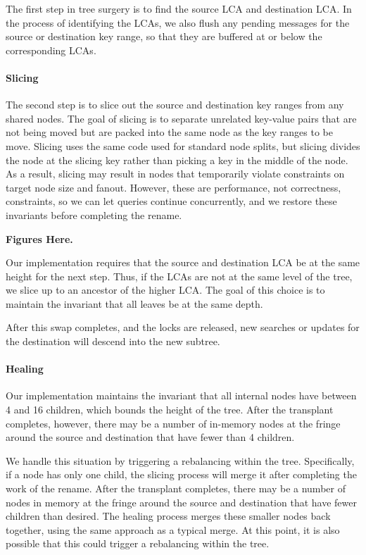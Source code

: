 The first step in tree surgery is to find the source LCA and destination LCA.
In the process of identifying the LCAs, we also flush any pending messages for
the source or destination key range, so that they are buffered at or below the
corresponding LCAs.

\paragraph{Slicing}  The second step is to slice out the source and destination
key ranges from any shared nodes.
The goal of slicing is to separate unrelated key-value pairs that are not being
moved but are packed into the same \bet node as the key ranges to be move.
Slicing uses the same  code used for standard \bet node splits, but slicing
divides the node at the slicing key rather than picking a key in the middle of
the node.
As a result, slicing may result in nodes that temporarily violate constraints on
target node size and fanout.
However, these are performance, not correctness, constraints, so we can let
queries continue concurrently, and we restore these invariants before completing
the rename.

\textbf{Figures Here.}

Our implementation requires that the source and destination LCA be at the same
height for the next step.
Thus, if the LCAs are not at the same level of the tree, we slice up to an
ancestor of the higher LCA.
The goal of this choice is to maintain the invariant that all \bet leaves be
at the same depth.

After this swap completes, and the locks are released,
new searches or updates for the destination will descend into the new subtree.

\paragraph{Healing}  Our \bet implementation maintains the
invariant that all internal nodes have between 4 and 16 children,
which bounds the height of the tree.  After the transplant completes,
however, there may be a number of in-memory \bet nodes at the fringe
around the source and destination that have fewer than 4 children.

We handle this situation by triggering a rebalancing within the tree.
Specifically, if a node has only one child, the slicing process will merge
it after completing the work of the rename.
After the transplant completes, there may be a number
of \bet nodes in memory at the fringe around the
source and destination that have fewer children than desired.
The healing process merges these smaller nodes back together,
using the same approach as a typical \bet merge.  At this point, it is also
possible that this could trigger a rebalancing within the tree.

